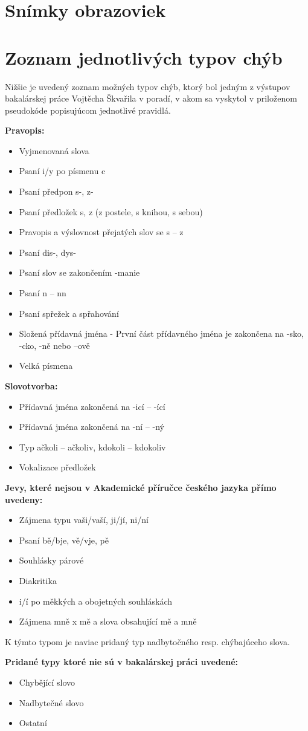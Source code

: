 \documentclass[12pt,oneside]{fithesis2}
\begin{document}
    \chapter{Snímky obrazoviek}
    \chapter{Zoznam jednotlivých typov chýb} \label{typy-chyb}
    \par Nižšie je uvedený zoznam možných typov chýb, ktorý bol jedným z výstupov bakalárskej práce Vojtěcha Škvařila\cite{skvaril14} v poradí, v akom sa vyskytol v priloženom pseudokóde popisujúcom jednotlivé pravidlá.
	\par \bigskip \textbf{Pravopis:}
\begin{itemize}
	\item Vyjmenovaná slova
	\item Psaní i/y po písmenu c
	\item Psaní předpon s-, z-
	\item Psaní předložek s, z (z postele, s knihou, s sebou)
	\item Pravopis a výslovnost přejatých slov se s – z
	\item Psaní dis-, dys-
	\item Psaní slov se zakončením -manie
	\item Psaní n – nn
	\item Psaní spřežek a spřahování
	\item Složená přídavná jména - První část přídavného jména je zakončena na -sko, -cko, -ně nebo –ově
	\item Velká písmena
\end{itemize}
\bigskip
	\textbf{Slovotvorba:}
\begin{itemize}
	\item Přídavná jména zakončená na -icí – -ící
	\item Přídavná jména zakončená na -ní – -ný
	\item Typ ačkoli – ačkoliv, kdokoli – kdokoliv
	\item Vokalizace předložek
\end{itemize}
\bigskip
	\textbf{Jevy, které nejsou v Akademické příručce českého jazyka přímo uvedeny:}
\begin{itemize}
	\item Zájmena typu vaši/vaší, ji/jí, ni/ní
	\item Psaní bě/bje, vě/vje, pě
	\item Souhlásky párové
	\item Diakritika
	\item i/í po měkkých a obojetných souhláskách
	\item Zájmena mně x mě a slova obsahující mě a mně
\end{itemize}

\par K týmto typom je naviac pridaný typ nadbytočného resp. chýbajúceho slova.
\par \bigskip
	\textbf{Pridané typy ktoré nie sú v bakalárskej práci uvedené:}
\begin{itemize}
	\item Chybějící slovo
	\item Nadbytečné slovo
	\item Ostatní
\end{itemize}
    
\end{document}
